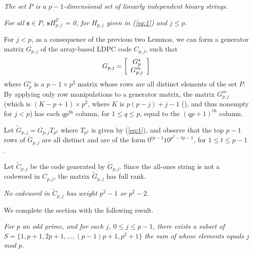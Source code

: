 \begin{lemma} \textit{The set $P$ is a $p-1$-dimensional
set of linearly independent binary strings.}\end{lemma}


\begin{lemma} \textit{For all $\mathbf{s} \in P$,
$\mathbf{s}H_{p,j}^T$ = 0, for $H_{p,j}$ given in (\ref{eq:1}) and
$j \leq p$.}\end{lemma}



For $j < p$, as a consequence of the previous two Lemmas, we can
form a generator matrix $G_{p,j}$ of the array-based LDPC code
$C_{p,j}$, such that \vspace{-0.14in}\begin{equation}\label{g}
G_{p,j}=\left[
\begin{array}{cc} G_{p}^{s}\\G_{p,j}^{m}
\end{array} \right]\vspace{-0.05in}
\end{equation}
where $G_{p}^{s}$ is a $p-1 \times p^2$ matrix whose rows are all
distinct elements of the set $P$. By applying only row
manipulations to a generator matrix, the matrix  $G_{p,j}^{m}$
(which is $(K-p+1)\times p^2$, where $K$ is $p(p-j)+j-1$
(\cite{mittel:02}), and thus nonempty for $j<p$) has each
$qp^{\text{th}}$ column, for $1 \leq q \leq p$, equal to the
$(qp+1)^{\text{th}}$ column.

Let $\tilde{G}_{p,j}=G_{p,j}T_{p^2}$ where $T_{p^2}$ is given by
(\ref{eq:t}), and observe that the top $p-1$ rows of
$\tilde{G}_{p,j}$ are all distinct and are of the form
$0^{tp-1}10^{p^2-tp-1}$, for $1 \leq t \leq p-1$.



Let $\tilde{C}_{p,j}$ be the code generated by $\tilde{G}_{p,j}$.
Since the all-ones string is not a codeword in $C_{p,j}$, the
matrix $\tilde{G}_{p,j}$ has full rank.

\begin{lemma}\label{lemma6}\textit{No codeword in $\tilde{C}_{p,j}$ has
weight $p^2-1$ or $p^2-2$}.\end{lemma}


We complete the section with the following result.

\begin{lemma}\label{lemma7}\textit{For $p$ an odd prime, and for each $j$, $0\leq j \leq
p-1$, there exists a subset of
$S=\{1,p+1,2p+1,\dots,(p-1)p+1,p^2+1\}$ the sum of whose elements
equals $j$ mod $p$.}\end{lemma}
